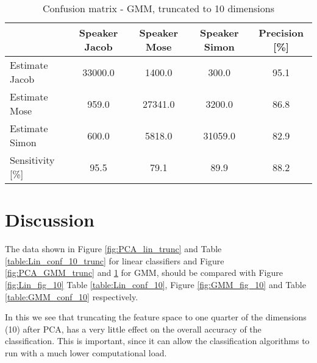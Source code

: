 \begin{table}[H]                                                    
\centering                                                          
\begin{tabular}{|l|c|c|c|c|}                                        
\hline                                                              
  & Speaker Jacob & Speaker Mose & Speaker Simon & Precision [\%] \\
\hline                                                              
Estimate Jacob & 33000.0 & 1400.0 & 300.0 & 95.1 \\                 
\hline                                                              
Estimate Mose & 959.0 & 27341.0 & 3200.0 & 86.8 \\                  
\hline                                                              
Estimate Simon & 600.0 & 5818.0 & 31059.0 & 82.9 \\                 
\hline                                                              
Sensitivity [\%] & 95.5 & 79.1 & 89.9 & 88.2 \\                     
\hline                                                              
\end{tabular}                                                       
\caption{Confusion matrix - GMM, truncated to 10 dimensions}        
\label{table:GMM_conf_10_trunc}                                     
\end{table} 



\section{Discussion}
The data shown in Figure \ref{fig:PCA_lin_trunc} and Table \ref{table:Lin_conf_10_trunc} for linear classifiers and Figure \ref{fig:PCA_GMM_trunc} and \ref{table:GMM_conf_10_trunc} for GMM, should be compared with Figure \ref{fig:Lin_fig_10} Table \ref{table:Lin_conf_10}, Figure \ref{fig:GMM_fig_10} and Table \ref{table:GMM_conf_10} respectively.

In this we see that truncating the feature space to one quarter of the dimensions (10) after PCA, has a very little effect on the overall accuracy of the classification.
This is important, since it can allow the classification algorithms to run with a much lower computational load.


